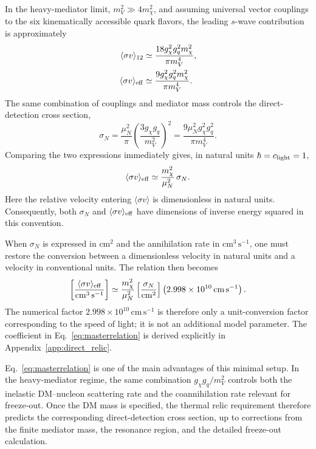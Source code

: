 \documentclass[aps,prd,reprint,superscriptaddress,nofootinbib,longbibliography,floatfix]{revtex4-2}
\begin{document}
In the heavy-mediator limit, $m_V^2\gg4m_\chi^2$, and assuming universal vector couplings to the six kinematically accessible quark flavors, the leading $s$-wave contribution is approximately
\begin{align}
\langle\sigma v\rangle_{12}&\simeq
\frac{18g_\chi^2g_q^2m_\chi^2}{\pi m_V^4},\\
\langle\sigma v\rangle_{\rm eff}&\simeq
\frac{9g_\chi^2g_q^2m_\chi^2}{\pi m_V^4}.
\label{eq:svgeneric}
\end{align}
The same combination of couplings and mediator mass controls the direct-detection cross section,
\begin{equation}
\sigma_N=
\frac{\mu_N^2}{\pi}
\left(\frac{3g_\chi g_q}{m_V^2}\right)^2
=
\frac{9\mu_N^2g_\chi^2g_q^2}{\pi m_V^4}.
\end{equation}
Comparing the two expressions immediately gives, in natural units $\hbar=c_{\rm light}=1$,
\begin{equation}
\langle\sigma v\rangle_{\rm eff}
\simeq
\frac{m_\chi^2}{\mu_N^2}\,\sigma_N .
\label{eq:masterrelationnatural}
\end{equation}
Here the relative velocity entering $\langle\sigma v\rangle$ is dimensionless in natural units. Consequently, both $\sigma_N$ and $\langle\sigma v\rangle_{\rm eff}$ have dimensions of inverse energy squared in this convention.

When $\sigma_N$ is expressed in $\mathrm{cm}^2$ and the annihilation rate in $\mathrm{cm^3\,s^{-1}}$, one must restore the conversion between a dimensionless velocity in natural units and a velocity in conventional units. The relation then becomes
\begin{equation}
\left[
\frac{\langle\sigma v\rangle_{\rm eff}}
{\mathrm{cm^3\,s^{-1}}}
\right]
\simeq
\frac{m_\chi^2}{\mu_N^2}
\left[
\frac{\sigma_N}{\mathrm{cm^2}}
\right]
\left(2.998\times10^{10}\,\mathrm{cm\,s^{-1}}\right).
\label{eq:masterrelation}
\end{equation}
The numerical factor $2.998\times10^{10}\,\mathrm{cm\,s^{-1}}$ is therefore only a unit-conversion factor corresponding to the speed of light; it is not an additional model parameter. The coefficient in Eq.~\eqref{eq:masterrelation} is derived explicitly in Appendix~\ref{app:direct_relic}.

Eq.~\eqref{eq:masterrelation} is one of the main advantages of this minimal setup. In the heavy-mediator regime, the same combination $g_\chi g_q/m_V^2$ controls both the inelastic DM--nucleon scattering rate and the coannihilation rate relevant for freeze-out. Once the DM mass is specified, the thermal relic requirement therefore predicts the corresponding direct-detection cross section, up to corrections from the finite mediator mass, the resonance region, and the detailed freeze-out calculation.
\end{document}
